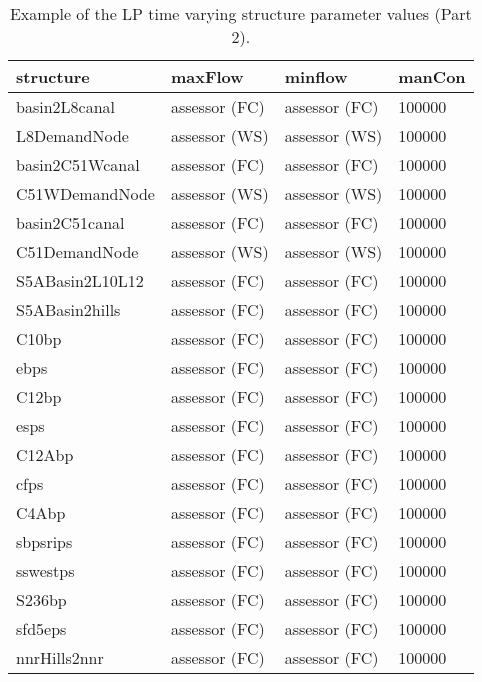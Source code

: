 \begin{table}[!htb]
 \begin{center}
  \footnotesize
  \caption{Example of the LP time varying structure parameter values (Part 2). }\label{strParaTs_2}
  \begin{tabular}{p{2.8cm}p{2.0cm}p{2.0cm}p{2.0cm}}                \\[0.8ex]
  structure        &maxFlow           &minflow          &manCon    \\
  \hline
  basin2L8canal    &assessor (FC)     &assessor (FC)    & 100000   \\
  L8DemandNode     &assessor (WS)     &assessor (WS)    & 100000   \\
  basin2C51Wcanal  &assessor (FC)     &assessor (FC)    & 100000   \\
  C51WDemandNode   &assessor (WS)     &assessor (WS)    & 100000   \\
  basin2C51canal   &assessor (FC)     &assessor (FC)    & 100000   \\
  C51DemandNode    &assessor (WS)     &assessor (WS)    & 100000   \\
  S5ABasin2L10L12  &assessor (FC)     &assessor (FC)    & 100000   \\
  S5ABasin2hills   &assessor (FC)     &assessor (FC)    & 100000   \\
  C10bp            &assessor (FC)     &assessor (FC)    & 100000   \\
  ebps             &assessor (FC)     &assessor (FC)    & 100000   \\
  C12bp            &assessor (FC)     &assessor (FC)    & 100000   \\
  esps             &assessor (FC)     &assessor (FC)    & 100000   \\
  C12Abp           &assessor (FC)     &assessor (FC)    & 100000   \\
  cfps             &assessor (FC)     &assessor (FC)    & 100000   \\
  C4Abp            &assessor (FC)     &assessor (FC)    & 100000   \\
  sbpsrips         &assessor (FC)     &assessor (FC)    & 100000   \\
  sswestps         &assessor (FC)     &assessor (FC)    & 100000   \\
  S236bp           &assessor (FC)     &assessor (FC)    & 100000   \\
  sfd5eps          &assessor (FC)     &assessor (FC)    & 100000   \\
  nnrHills2nnr     &assessor (FC)     &assessor (FC)    & 100000   \\

\end{tabular}
\end{center}
\end{table}
